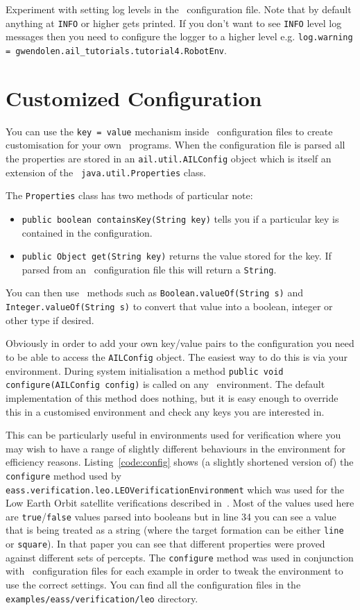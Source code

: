\documentclass[a4]{article}
\begin{document}
Experiment with setting log levels in the \ail\ configuration file.  Note that by default anything at \texttt{INFO} or higher gets printed.  If you don't want to see \texttt{INFO} level log messages then you need to configure the logger to a higher level e.g. \texttt{log.warning = gwendolen.ail\_tutorials.tutorial4.RobotEnv}.

\section{Customized Configuration}

You can use the \texttt{key = value} mechanism inside \ail\ configuration files to create customisation for your own \ail\ programs.  When the configuration file is parsed all the properties are stored in an \texttt{ail.util.AILConfig} object which is itself an extension of the \java\ \texttt{java.util.Properties} class.  

The \texttt{Properties} class has two methods of particular note:
\begin{itemize}
\item \texttt{public boolean containsKey(String key)} tells you if a particular key is contained in the configuration.  
\item \texttt{public Object get(String key)} returns the value stored for the key.  If parsed from an \ail\ configuration file this will return a \texttt{String}.
\end{itemize}
You can then use \java\ methods such as \texttt{Boolean.valueOf(String s)} and \texttt{Integer.valueOf(String s)} to convert that value into a boolean, integer or other type if desired.

Obviously in order to add your own key/value pairs to the configuration you need to be able to access the \texttt{AILConfig} object.  The easiest way to do this is via your environment.  During system initialisation a method \texttt{public void configure(AILConfig config)} is called on any \ail\ environment.  The default implementation of this method does nothing, but it is easy enough to override this in a customised environment and check any keys you are interested in.

This can be particularly useful in environments used for verification where you may wish to have a range of slightly different behaviours in the environment for efficiency reasons.  Listing~\ref{code:config} shows (a slightly shortened version of) the \texttt{configure} method used by \texttt{eass.verification.leo.LEOVerificationEnvironment} which was used for the Low Earth Orbit satellite verifications described in~\cite{dennis14:_pract}.  Most of the values used here are \texttt{true}/\texttt{false} values parsed into booleans but in line 34 you can see a value that is being treated as a string (where the target formation can be either \texttt{line} or \texttt{square}).  In that paper you can see that different properties were proved against different sets of percepts.  The \texttt{configure} method was used in conjunction with \ail\ configuration files for each example in order to tweak the environment to use the correct settings.  You can find all the configuration files in the \texttt{examples/eass/verification/leo} directory.
\end{document}
